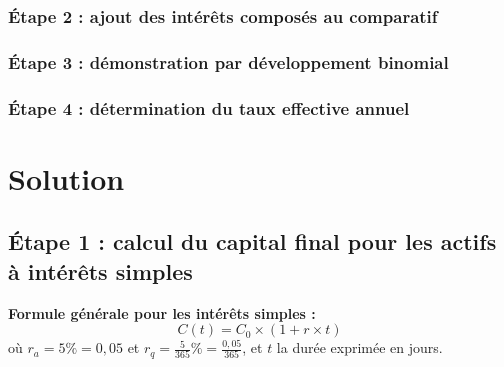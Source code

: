 \documentclass{article}
\begin{document}
\subsubsection*{Étape 2 : ajout des intérêts composés au comparatif}



\subsubsection*{Étape 3 : démonstration par développement binomial}
\subsubsection*{Étape 4 : détermination du taux effective annuel}

\newpage
\section{Solution}
\subsection*{Étape 1 : calcul du capital final pour les actifs à intérêts simples}

\noindent
\textbf{Formule générale pour les intérêts simples :}
\[
C(t) = C_0 \times \left(1 + r \times t\right)
\]
où $r_a = 5\% = 0,05$ et \( r_q = \frac{5}{365}\% = \frac{0,05}{365} \), et \( t \) la durée exprimée en jours.
\end{document}
